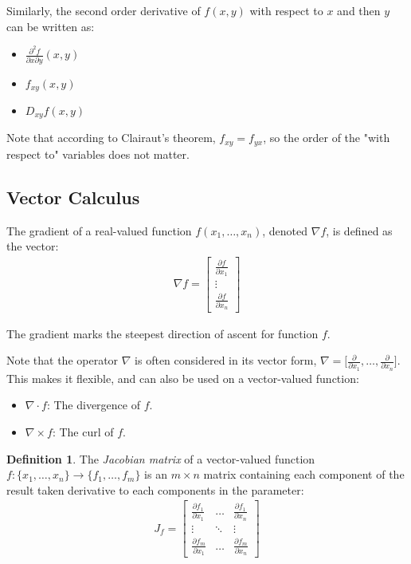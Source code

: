 \documentclass[12pt]{article}
\theoremstyle{definition}
\newtheorem{defn}{Definition}[section]
\newcommand{\bras}[1]{\lbrace #1 \rbrace}
\newcommand{\braks}[1]{\lbrack #1 \rbrack}
\begin{document}
 	Similarly, the second order derivative of $f(x, y)$ with respect to $x$ and then $y$ can be written as:
 	\begin{itemize}
 		\item $\frac{\partial^2 f}{\partial x \partial y}(x, y)$
 		\item $f_{xy}(x, y)$
 		\item $D_{xy}f(x, y)$
 	\end{itemize}
 	
 	Note that according to Clairaut's theorem, $f_{xy} = f_{yx}$, so the order of the "with respect to" variables does not matter.
 	
 	\subsection{Vector Calculus}
 	
 	The gradient of a real-valued function $f(x_1, \dots, x_n)$, denoted $\nabla f$, is defined as the vector:
 	\begin{gather*}
 	\nabla f = 
	\begin{bmatrix}
 		\frac{\partial f}{\partial x_1} \\
 		\vdots \\
 		\frac{\partial f}{\partial x_n}
 	\end{bmatrix}
 	\end{gather*}
 	
 	The gradient marks the steepest direction of ascent for function $f$.
 	
 	Note that the operator $\nabla$ is often considered in its vector form, $\nabla = \braks{\frac{\partial}{\partial x_1}, \dots, \frac{\partial}{\partial x_n}}$. This makes it flexible, and can also be used on a vector-valued function:
 	\begin{itemize}
 		\item $\nabla \cdot f$: The divergence of $f$.
 		\item $\nabla \times f$: The curl of $f$.
 	\end{itemize}
 	
 	\begin{defn}
 		The \emph{Jacobian matrix} of a vector-valued function $f : \bras{x_1, \dots, x_n} \to \bras{f_1, \dots, f_m}$ is an $m \times n$ matrix containing each component of the result taken derivative to each components in the parameter:
 		\begin{gather*}
 		J_f = 
 		\begin{bmatrix}
 			\frac{\partial f_1}{\partial x_1} & \dots & \frac{\partial f_1}{\partial x_n} \\
 			\vdots & \ddots & \vdots \\
 			\frac{\partial f_m}{\partial x_1} & \dots & \frac{\partial f_m}{\partial x_n}
 		\end{bmatrix}
 		\end{gather*}
 	\end{defn}
 	
\end{document}
